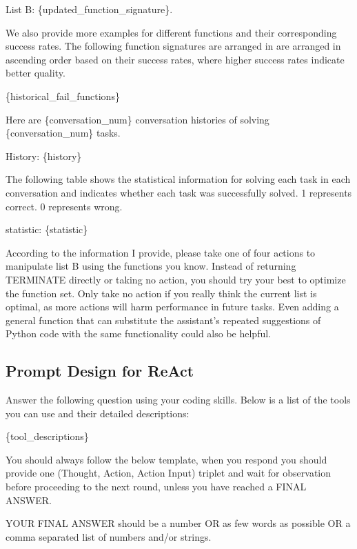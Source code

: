 \documentclass{article}
\theoremstyle{plain}
\theoremstyle{definition}
\theoremstyle{remark}
\begin{document}
List B: \textcolor{burntorange}{{\{updated\_function\_signature\}}}.

We also provide more examples for different functions and their corresponding success rates. The following function signatures are arranged in are arranged in ascending order based on their success rates, where higher success rates indicate better quality.

\textcolor{burntorange}{{\{historical\_fail\_functions\}}}

Here are\textcolor{burntorange}{{ \{conversation\_num\}}} conversation histories of solving \textcolor{burntorange}{{\{conversation\_num\}}} tasks.

History:
\textcolor{burntorange}{{\{history\}}}

The following table shows the statistical information for solving each task in each conversation and indicates whether each task was successfully solved. 
1 represents correct. 0 represents wrong.

statistic: 
\textcolor{burntorange}{{\{statistic\}}}

According to the information I provide, please take one of four actions to manipulate list B using the functions you know. 
Instead of returning TERMINATE directly or taking no action, you should try your best to optimize the function set. Only take no action if you really think the current list is optimal, as more actions will harm performance in future tasks. 
Even adding a general function that can substitute the assistant’s repeated suggestions of Python code with the same functionality could also be helpful.

\subsection{Prompt Design for ReAct}

Answer the following question using your coding skills. Below is a list of the tools you can use and their detailed descriptions:

\textcolor{burntorange}{{\{tool\_descriptions\}}}

You should always follow the below template, when you respond you should provide one (Thought, Action, Action Input) triplet and wait for observation before proceeding to the next round, unless you have reached a FINAL ANSWER.

YOUR FINAL ANSWER should be a number OR as few words as possible OR a comma separated list of numbers and/or strings.
\end{document}
